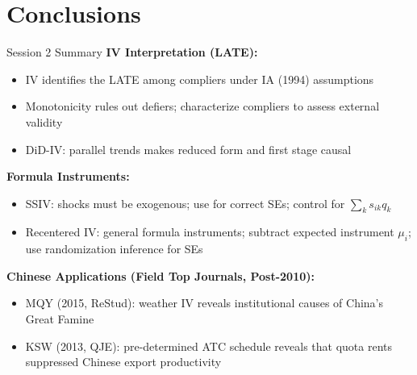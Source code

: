 \documentclass{beamer}
\begin{document}
\section{Conclusions}

\begin{frame}{Session 2 Summary}
\textbf{IV Interpretation (LATE):}
\begin{itemize}
  \item IV identifies the LATE among compliers under IA (1994) assumptions
  \item Monotonicity rules out defiers; characterize compliers to assess
        external validity
  \item DiD-IV: parallel trends makes reduced form and first stage causal
\end{itemize}

\medskip
\textbf{Formula Instruments:}
\begin{itemize}
  \item SSIV: shocks must be exogenous; use  for
        correct SEs; control for $\sum_k s_{ik}q_k$
  \item Recentered IV: general formula instruments; subtract expected
        instrument $\mu_i$; use randomization inference for SEs
\end{itemize}

\medskip
\textbf{Chinese Applications (Field Top Journals, Post-2010):}
\begin{itemize}
  \item MQY (2015, ReStud): weather IV reveals institutional causes
        of China's Great Famine
  \item KSW (2013, QJE): pre-determined ATC schedule reveals that quota
        rents suppressed Chinese export productivity
\end{itemize}
\end{frame}
\end{document}
